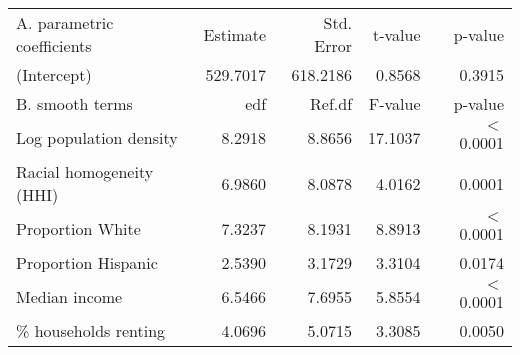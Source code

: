 \begin{table}[ht]
\centering
\begin{tabular}{lrrrr}
   \hline
A. parametric coefficients & Estimate & Std. Error & t-value & p-value \\ 
  (Intercept) & 529.7017 & 618.2186 & 0.8568 & 0.3915 \\ 
   \hline
B. smooth terms & edf & Ref.df & F-value & p-value \\ 
  Log population density & 8.2918 & 8.8656 & 17.1037 & $<$ 0.0001 \\ 
  Racial homogeneity (HHI) & 6.9860 & 8.0878 & 4.0162 & 0.0001 \\ 
  Proportion White & 7.3237 & 8.1931 & 8.8913 & $<$ 0.0001 \\ 
  Proportion Hispanic & 2.5390 & 3.1729 & 3.3104 & 0.0174 \\ 
  Median income & 6.5466 & 7.6955 & 5.8554 & $<$ 0.0001 \\ 
  \% households renting & 4.0696 & 5.0715 & 3.3085 & 0.0050 \\ 
   \hline
\end{tabular}
\caption{ } 
\label{Demographic GAM}
\end{table}
